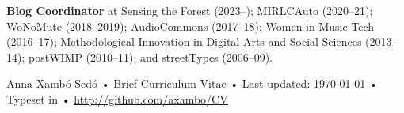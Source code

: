 \documentclass[10pt, a4paper]{article}
\begin{document}
{\textbf{Blog Coordinator}} at Sensing the Forest (2023--); MIRLCAuto (2020--21); WoNoMute (2018--2019); AudioCommons (2017--18); Women in Music Tech (2016--17); Methodological Innovation in Digital Arts and Social Sciences (2013--14); postWIMP (2010--11); and streetTypes (2006--09).


\begin{center}
{\scriptsize  Anna Xambó Sedó •\- Brief Curriculum Vitae •\- Last updated: \today\- •\- %
Typeset in \href{http://nitens.org/taraborelli/cvtex}{
\XeTeX } %
•\- 
\href{http://github.com/axambo/CV}{http://github.com/axambo/CV}}
\end{center}
\end{document}
